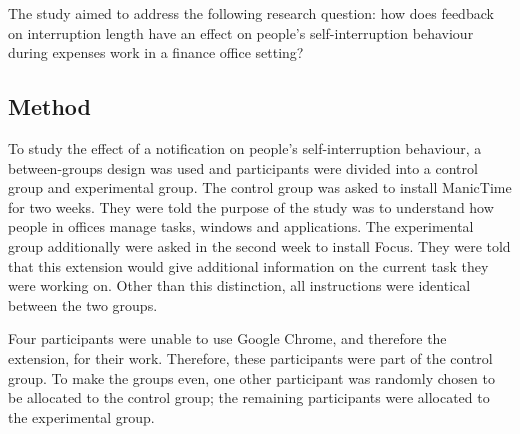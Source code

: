 The study aimed to address the following research question: how does feedback on interruption length have an effect on people's self-interruption behaviour during expenses work in a finance office setting? 

\subsection{Method}
To study the effect of a notification on people's self-interruption behaviour, a between-groups design was used and participants were divided into a control group and experimental group. The control group was asked to install ManicTime for two weeks. They were told the purpose of the study was to understand how people in offices manage tasks, windows and applications. The experimental group additionally were asked in the second week to install Focus. They were told that this extension would give additional information on the current task they were working on. Other than this distinction, all instructions were identical between the two groups. 

Four participants were unable to use Google Chrome, and therefore the extension, for their work. Therefore, these participants were part of the control group. To make the groups even, one other participant was randomly chosen to be allocated to the control group; the remaining participants were allocated to the experimental group. 


